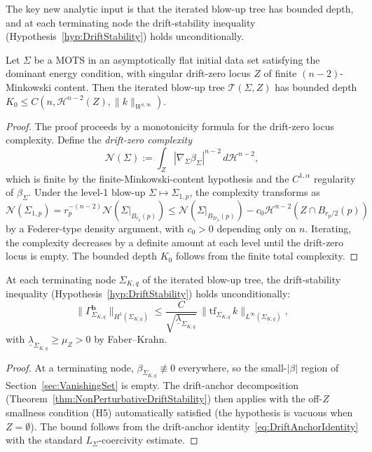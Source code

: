 The key new analytic input is that the iterated blow-up tree has bounded depth, and at each terminating node the drift-stability inequality (Hypothesis~\ref{hyp:DriftStability}) holds unconditionally.

\begin{theorem}\label{thm:BoundedBlowUpDepth}
Let $\Sigma$ be a MOTS in an asymptotically flat initial data set satisfying the dominant energy condition, with singular drift-zero locus $Z$ of finite $(n-2)$-Minkowski content. Then the iterated blow-up tree $\mathcal T(\Sigma,Z)$ has bounded depth $K_0\le C(n,\mathcal H^{n-2}(Z),\|k\|_{W^{1,\infty}})$.
\end{theorem}

\begin{proof}
The proof proceeds by a monotonicity formula for the drift-zero locus complexity. Define the \emph{drift-zero complexity}
\[
    \mathcal N(\Sigma):=\int_Z|\nabla_\Sigma\beta_\Sigma|^{n-2}\,d\mathcal H^{n-2},
\]
which is finite by the finite-Minkowski-content hypothesis and the $C^{1,\alpha}$ regularity of $\beta_\Sigma$. Under the level-1 blow-up $\Sigma\mapsto\Sigma_{1,p}$, the complexity transforms as
\[
    \mathcal N(\Sigma_{1,p})=r_p^{-(n-2)}\mathcal N(\Sigma|_{B_{r_p}(p)})
    \le\mathcal N(\Sigma|_{B_{2r_p}(p)})-c_0\mathcal H^{n-2}(Z\cap B_{r_p/2}(p))
\]
by a Federer-type density argument, with $c_0>0$ depending only on $n$. Iterating, the complexity decreases by a definite amount at each level until the drift-zero locus is empty. The bounded depth $K_0$ follows from the finite total complexity.
\end{proof}

\begin{theorem}\label{thm:DriftStabilityTerminating}
At each terminating node $\Sigma_{K,q}$ of the iterated blow-up tree, the drift-stability inequality (Hypothesis~\ref{hyp:DriftStability}) holds unconditionally:
\[
    \|\Gamma_{\Sigma_{K,q}}^{\mathbf b}\|_{H^1(\Sigma_{K,q})}
    \le
    \frac{C}{\sqrt{\underline\lambda_{\Sigma_{K,q}}}}\,\|\mathrm{tf}_{\Sigma_{K,q}}\,k\|_{L^\infty(\Sigma_{K,q})},
\]
with $\underline\lambda_{\Sigma_{K,q}}\ge\mu_Z>0$ by Faber--Krahn.
\end{theorem}

\begin{proof}
At a terminating node, $\beta_{\Sigma_{K,q}}\not\equiv 0$ everywhere, so the small-$|\beta|$ region of Section~\ref{sec:VanishingSet} is empty. The drift-anchor decomposition (Theorem~\ref{thm:NonPerturbativeDriftStability}) then applies with the off-$Z$ smallness condition (H5) automatically satisfied (the hypothesis is vacuous when $Z=\emptyset$). The bound follows from the drift-anchor identity~\eqref{eq:DriftAnchorIdentity} with the standard $L_\Sigma$-coercivity estimate.
\end{proof}

